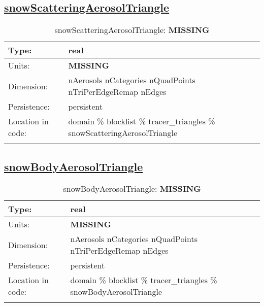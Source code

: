 \subsection[snowScatteringAerosolTriangle]{\hyperref[sec:var_tab_tracer_triangles]{snowScatteringAerosolTriangle}}
\label{subsec:var_sec_tracer_triangles_snowScatteringAerosolTriangle}
\begin{center}
\begin{longtable}{| p{2.0in} | p{4.0in} |}
        \hline 
        Type: & real \\
        \hline 
        Units: & {\bf \color{red} MISSING} \\
        \hline 
        Dimension: & nAerosols nCategories nQuadPoints nTriPerEdgeRemap nEdges \\
        \hline 
        Persistence: & persistent \\
        \hline 
         Location in code: & domain \% blocklist \% tracer\_triangles \% snowScatteringAerosolTriangle \\
         \hline 
    \caption{snowScatteringAerosolTriangle: {\bf \color{red} MISSING}}
\end{longtable}
\end{center}
\subsection[snowBodyAerosolTriangle]{\hyperref[sec:var_tab_tracer_triangles]{snowBodyAerosolTriangle}}
\label{subsec:var_sec_tracer_triangles_snowBodyAerosolTriangle}
\begin{center}
\begin{longtable}{| p{2.0in} | p{4.0in} |}
        \hline 
        Type: & real \\
        \hline 
        Units: & {\bf \color{red} MISSING} \\
        \hline 
        Dimension: & nAerosols nCategories nQuadPoints nTriPerEdgeRemap nEdges \\
        \hline 
        Persistence: & persistent \\
        \hline 
         Location in code: & domain \% blocklist \% tracer\_triangles \% snowBodyAerosolTriangle \\
         \hline 
    \caption{snowBodyAerosolTriangle: {\bf \color{red} MISSING}}
\end{longtable}
\end{center}
